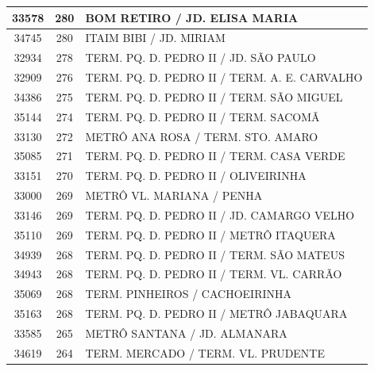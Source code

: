 \documentclass[
	12pt,				%
	oneside,			%
	a4paper,			%
	english,			%
	brazil				%
	]{abntex2ppgsi}
\begin{document}
{{\begin{apendicesenv}
\begin{longtable}{c|c|p{7cm}}
    33578 & 280   & BOM RETIRO / JD. ELISA MARIA \\
\hline

    34745 & 280   & ITAIM BIBI / JD. MIRIAM \\
\hline

    32934 & 278   & TERM. PQ. D. PEDRO II / JD. SÃO PAULO \\
\hline

    32909 & 276   & TERM. PQ. D. PEDRO II / TERM. A. E. CARVALHO \\
\hline

    34386 & 275   & TERM. PQ. D. PEDRO II / TERM. SÃO MIGUEL \\
\hline

    35144 & 274   & TERM. PQ. D. PEDRO II / TERM. SACOMÃ \\
\hline

    33130 & 272   & METRÔ ANA ROSA / TERM. STO. AMARO \\
\hline

    35085 & 271   & TERM. PQ. D. PEDRO II / TERM. CASA VERDE \\
\hline

    33151 & 270   & TERM. PQ. D. PEDRO II / OLIVEIRINHA \\
\hline

    33000 & 269   & METRÔ VL. MARIANA / PENHA \\
\hline

    33146 & 269   & TERM. PQ. D. PEDRO II / JD. CAMARGO VELHO \\
\hline

    35110 & 269   & TERM. PQ. D. PEDRO II / METRÔ ITAQUERA \\
\hline

    34939 & 268   & TERM. PQ. D. PEDRO II / TERM. SÃO MATEUS \\
\hline

    34943 & 268   & TERM. PQ. D. PEDRO II / TERM. VL. CARRÃO \\
\hline

    35069 & 268   & TERM. PINHEIROS / CACHOEIRINHA \\
\hline

    35163 & 268   & TERM. PQ. D. PEDRO II / METRÔ JABAQUARA \\
\hline

    33585 & 265   & METRÔ SANTANA / JD. ALMANARA \\
\hline

    34619 & 264   & TERM. MERCADO / TERM. VL. PRUDENTE \\
\hline


\end{longtable}
\end{apendicesenv}}}
\end{document}

